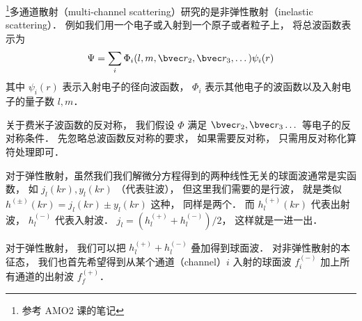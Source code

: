 
\footnote{参考 AMO2 课的笔记}多通道散射（multi-channel scattering）研究的是非弹性散射（inelastic scattering）． 例如我们用一个电子或入射到一个原子或者粒子上， 将总波函数表示为
\begin{equation}
\Psi = \sum_i \Phi_i (l, m, \bvec r_2, \bvec r_3, \dots) \psi_i (r)
\end{equation}
其中 $\psi_i(r)$ 表示入射电子的径向波函数， $\Phi_i$ 表示其他电子的波函数以及入射电子的量子数 $l, m$．

关于费米子波函数的反对称， 我们假设 $\Phi$ 满足 $\bvec r_2, \bvec r_3 \dots$ 等电子的反对称条件． 先忽略总波函数反对称的要求， 如果需要反对称， 只需用反对称化算符处理即可．

对于弹性散射，虽然我们我们解微分方程得到的两种线性无关的球面波通常是实函数， 如 $j_l(kr), y_l(kr)$ （代表驻波）， 但这里我们需要的是行波， 就是类似 $h^{(\pm)}(kr) = j_l(kr) \pm y_l(kr)$ 这种， 同样是两个． 而 $h_l^{(+)}(kr)$ 代表出射波， $h_l^{(-)}$ 代表入射波． $j_l = (h_l^{(+)} + h_l^{(-)})/2$， 这样就是一进一出．

对于弹性散射， 我们可以把 $h_l^{(+)} + h_l^{(-)}$ 叠加得到球面波． 对非弹性散射的本征态， 我们也首先希望得到从某个通道（channel）$i$ 入射的球面波 $f_i^{(-)}$ 加上所有通道的出射波 $f_f^{(+)}$．
